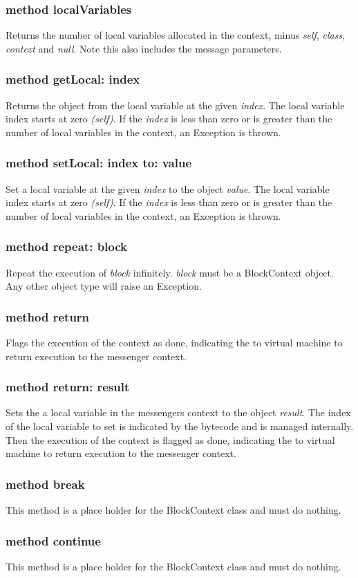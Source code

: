 \subsubsection {method localVariables}
Returns the number of local variables allocated in the context, minus
\textit{self}, \textit{class}, \textit{context} and \textit{null}. Note this
also includes the message parameters.

\subsubsection {method getLocal: index}
Returns the object from the local variable at the given \textit{index}. The
local variable index starts at zero \textit{(self)}. If the \textit{index} is
less than zero or is greater than the number of local variables in the
context, an Exception is thrown.

\subsubsection {method setLocal: index to: value}
Set a local variable at the given \textit{index} to the object \textit{value}.
The local variable index starts at zero \textit{(self)}. If the \textit{index}
is less than zero or is greater than the number of local variables in the
context, an Exception is thrown.

\subsubsection {method repeat: block}
Repeat the execution of \textit{block} infinitely. \textit{block} must be
a BlockContext object. Any other object type will raise an Exception.

\subsubsection {method return}
Flags the execution of the context as done, indicating the to virtual
machine to return execution to the messenger context.

\subsubsection {method return: result}
Sets the a local variable in the messengers context to the object
\textit{result}. The index of the local variable to set is indicated by the
bytecode and is managed internally. Then the execution of the context is
flagged as done, indicating the to virtual machine to return execution to the
messenger context.

\subsubsection{method break}
This method is a place holder for the BlockContext class and must do nothing.

\subsubsection{method continue}
This method is a place holder for the BlockContext class and must do nothing.

